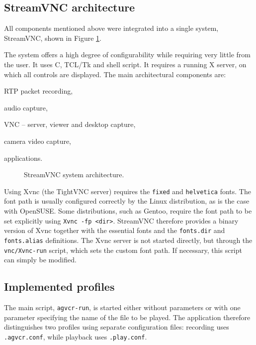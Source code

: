 \subsection{StreamVNC architecture}

All components mentioned above were integrated into a single system, StreamVNC, shown in Figure \ref{fig:ArchStreamVNC}.

The system offers a high degree of configurability while requiring very little from the user. It uses C, TCL/Tk and shell script. It requires a running X server, on which all controls are displayed. The main architectural components are:
\begin{paklist}
\item RTP packet recording,
\item audio capture,
\item VNC -- server, viewer and desktop capture,
\item camera video capture,
\item applications.
\end{paklist}

\begin{figure}
\centering

\caption{StreamVNC system architecture.}
\label{fig:ArchStreamVNC}
\end{figure}

Using Xvnc (the TightVNC server) requires the \verb|fixed| and \verb|helvetica| fonts. The font path is usually configured correctly by the Linux distribution, as is the case with OpenSUSE. Some distributions, such as Gentoo, require the font path to be set explicitly using \verb|Xvnc -fp <dir>|. StreamVNC therefore provides a binary version of Xvnc together with the essential fonts and the \verb|fonts.dir| and \verb|fonts.alias| definitions. The Xvnc server is not started directly, but through the \verb|vnc/Xvnc-run| script, which sets the custom font path. If necessary, this script can simply be modified.

\subsection{Implemented profiles}
The main script, \verb|agvcr-run|, is started either without parameters or with one parameter specifying the name of the file to be played. The application therefore distinguishes two profiles using separate configuration files: recording uses \verb|.agvcr.conf|, while playback uses \verb|.play.conf|.

